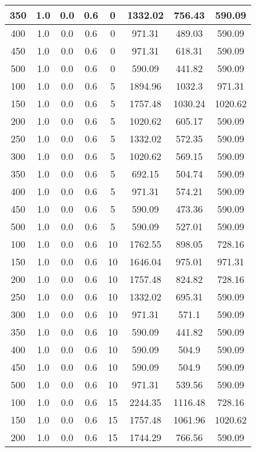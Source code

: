 \documentclass[a4paper, 12pt]{extreport}
\begin{document}
\begin{itemize}
\begin{longtable}{|c|c|c|c|c|c|c|c|}
			350 & 1.0 & 0.0 & 0.6 & 0 & 1332.02 & 756.43 & 590.09 \\\hline
			400 & 1.0 & 0.0 & 0.6 & 0 & 971.31 & 489.03 & 590.09 \\\hline
			450 & 1.0 & 0.0 & 0.6 & 0 & 971.31 & 618.31 & 590.09 \\\hline
			500 & 1.0 & 0.0 & 0.6 & 0 & 590.09 & 441.82 & 590.09 \\\hline
			100 & 1.0 & 0.0 & 0.6 & 5 & 1894.96 & 1032.3 & 971.31 \\\hline
			150 & 1.0 & 0.0 & 0.6 & 5 & 1757.48 & 1030.24 & 1020.62 \\\hline
			200 & 1.0 & 0.0 & 0.6 & 5 & 1020.62 & 605.17 & 590.09 \\\hline
			250 & 1.0 & 0.0 & 0.6 & 5 & 1332.02 & 572.35 & 590.09 \\\hline
			300 & 1.0 & 0.0 & 0.6 & 5 & 1020.62 & 569.15 & 590.09 \\\hline
			350 & 1.0 & 0.0 & 0.6 & 5 & 692.15 & 504.74 & 590.09 \\\hline
			400 & 1.0 & 0.0 & 0.6 & 5 & 971.31 & 574.21 & 590.09 \\\hline
			450 & 1.0 & 0.0 & 0.6 & 5 & 590.09 & 473.36 & 590.09 \\\hline
			500 & 1.0 & 0.0 & 0.6 & 5 & 590.09 & 527.01 & 590.09 \\\hline
			100 & 1.0 & 0.0 & 0.6 & 10 & 1762.55 & 898.05 & 728.16 \\\hline
			150 & 1.0 & 0.0 & 0.6 & 10 & 1646.04 & 975.01 & 971.31 \\\hline
			200 & 1.0 & 0.0 & 0.6 & 10 & 1757.48 & 824.82 & 728.16 \\\hline
			250 & 1.0 & 0.0 & 0.6 & 10 & 1332.02 & 695.31 & 590.09 \\\hline
			300 & 1.0 & 0.0 & 0.6 & 10 & 971.31 & 571.1 & 590.09 \\\hline
			350 & 1.0 & 0.0 & 0.6 & 10 & 590.09 & 441.82 & 590.09 \\\hline
			400 & 1.0 & 0.0 & 0.6 & 10 & 590.09 & 504.9 & 590.09 \\\hline
			450 & 1.0 & 0.0 & 0.6 & 10 & 590.09 & 504.9 & 590.09 \\\hline
			500 & 1.0 & 0.0 & 0.6 & 10 & 971.31 & 539.56 & 590.09 \\\hline
			100 & 1.0 & 0.0 & 0.6 & 15 & 2244.35 & 1116.48 & 728.16 \\\hline
			150 & 1.0 & 0.0 & 0.6 & 15 & 1757.48 & 1061.96 & 1020.62 \\\hline
			200 & 1.0 & 0.0 & 0.6 & 15 & 1744.29 & 766.56 & 590.09 \\\hline

\end{longtable}
\end{itemize}
\end{document}
